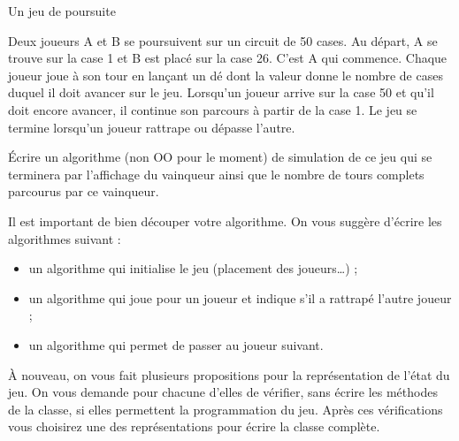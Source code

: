 \begin{Exercice}{Un jeu de poursuite}

	Deux joueurs A et B se poursuivent sur un circuit de 50 cases. 
	Au départ, A se trouve sur la case 1 et B est placé sur la case 26.
	C’est A qui commence. 
	Chaque joueur joue à son tour en lançant un dé dont la valeur 
	donne le nombre de cases duquel il doit avancer sur le jeu. 
	Lorsqu’un joueur arrive sur la case 50 et qu’il doit encore avancer, 
	il continue son parcours à partir de la case 1. 
	Le jeu se termine lorsqu’un joueur rattrape ou dépasse l’autre.

	Écrire un algorithme (non OO pour le moment) de simulation de ce jeu
	qui se terminera par l’affichage du vainqueur ainsi que le nombre de
	tours complets parcourus par ce vainqueur. 

	Il est important de bien découper votre algorithme.
	On vous suggère d'écrire les algorithmes suivant :
	\begin{itemize}
		\item 
			un algorithme  qui initialise le jeu
			(placement des joueurs\dots) ;
		\item 
			un algorithme \og{}\fg{} 
			qui joue pour un joueur et indique s'il a rattrapé l’autre joueur ;
		\item 
			un algorithme \og{}\fg{} 
			qui permet de passer au joueur suivant.
	\end{itemize}

	À nouveau, on vous fait plusieurs propositions pour la représentation
	de l'état du jeu.
	On vous demande pour chacune d'elles de vérifier, 
	sans écrire les méthodes de la classe, 
	si elles permettent la programmation du jeu. 
	Après ces vérifications vous choisirez 
	une des représentations pour écrire la classe complète.
	

\end{Exercice}
